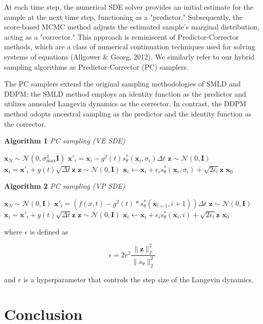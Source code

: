 At each time step, the numerical SDE solver provides an initial estimate for the sample at the next time step, functioning as a "predictor." Subsequently, the score-based MCMC method adjusts the estimated sample's marginal distribution, acting as a "corrector." This approach is reminiscent of Predictor-Corrector methods, which are a class of numerical continuation techniques used for solving systems of equations (Allgower \& Georg, 2012). We similarly refer to our hybrid sampling algorithms as Predictor-Corrector (PC) samplers.

The PC samplers extend the original sampling methodologies of SMLD and DDPM: the SMLD method employs an identity function as the predictor and utilizes annealed Langevin dynamics as the corrector. In contrast, the DDPM method adopts ancestral sampling as the predictor and the identity function as the corrector.

\noindent\textbf{Algorithm 1} \textit{PC sampling (VE SDE)}
\begin{algorithmic}[1]
    \STATE $\mathbf{x}_N \sim \mathcal{N}(0, \sigma_{\max}^2 \mathbf{I})$
        \STATE $\mathbf{x}'_i = \mathbf{x}_i -g^2(t)s_\theta^* \left( \mathbf{x}_i, \sigma_i \right) {\Delta t}$
        \STATE $\mathbf{z} \sim \mathcal{N}(0, \mathbf{I})$
        \STATE $\mathbf{x}_i = \mathbf{x}'_i +g(t) \sqrt{\Delta t} \mathbf{z}$
            \STATE $\mathbf{z} \sim \mathcal{N}(0, \mathbf{I})$
            \STATE $\mathbf{x}_i \leftarrow \mathbf{x}_i + \epsilon_i s_\theta^* \left( \mathbf{x}_i, \sigma_i \right) + \sqrt{2 \epsilon_i} \mathbf{z}$
        \ENDFOR
    \ENDFOR
    \RETURN $\mathbf{x}_0$
\end{algorithmic}

\bigskip

\noindent\textbf{Algorithm 2} \textit{PC sampling (VP SDE)}
\begin{algorithmic}[1]
    \STATE $\mathbf{x}_N \sim \mathcal{N}(0, \mathbf{I})$
        \STATE $\mathbf{x}'_i = (f(x,t)-g^2(t)*s_\theta^* \left( \mathbf{x}_{i+1}, i+1 \right)) {\Delta t}$
        \STATE $\mathbf{z} \sim \mathcal{N}(0, \mathbf{I})$
        \STATE $\mathbf{x}_i = \mathbf{x}'_i +g(t) \sqrt{\Delta t} \mathbf{z}$
            \STATE $\mathbf{z} \sim \mathcal{N}(0, \mathbf{I})$
            \STATE $\mathbf{x}_i \leftarrow \mathbf{x}_i + \epsilon_i s_\theta^* \left( \mathbf{x}_i, i \right) + \sqrt{2 \epsilon_i} \mathbf{z}$
        \ENDFOR
    \ENDFOR
    \RETURN $\mathbf{x}_0$
\end{algorithmic}

where $\epsilon$ is defined as 

\begin{equation}
    \epsilon = 2 r^2 \frac{\|\mathbf{z}\|_2^2}{\|s_\theta\|_2^2}
\end{equation}

and $r$ is a hyperparameter that controls the step size of the Langevin dynamics.

\section{Conclusion}







